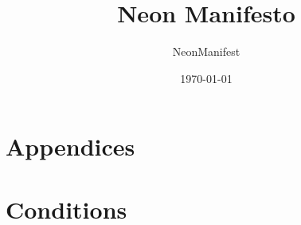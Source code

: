 \documentclass{article}
\title{Neon Manifesto}
\author{NeonManifest}
\date{\today}
\begin{document}
\maketitle

\tableofcontents









\appendix
\section*{Appendices}
\section{Conditions}
\label{app:conditions}
\end{document}
